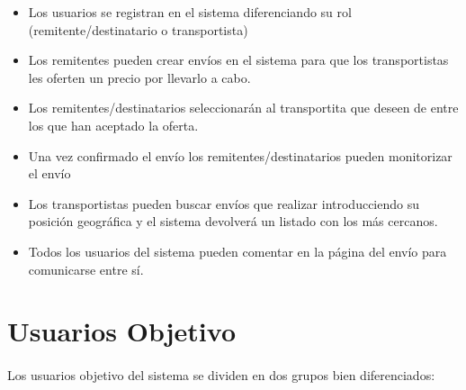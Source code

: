 \documentclass[10pt, a4paper,spanish]{article}
\begin{document}
			\begin{itemize}

				\item Los usuarios se registran en el sistema diferenciando su rol (remitente/destinatario o transportista)

				\item Los remitentes pueden crear envíos en el sistema para que los transportistas les oferten un precio por llevarlo a cabo.

				\item Los remitentes/destinatarios seleccionarán al transportita que deseen de entre los que han aceptado la oferta.

				\item Una vez confirmado el envío los remitentes/destinatarios pueden monitorizar el envío

				\item Los transportistas pueden buscar envíos que realizar introducciendo su posición geográfica y el sistema devolverá un listado con los más cercanos.

				\item Todos los usuarios del sistema pueden comentar en la página del envío para comunicarse entre sí.
			\end{itemize}



		\section{Usuarios Objetivo}

			\paragraph{}
			Los usuarios objetivo del sistema se dividen en dos grupos bien diferenciados:
\end{document}
